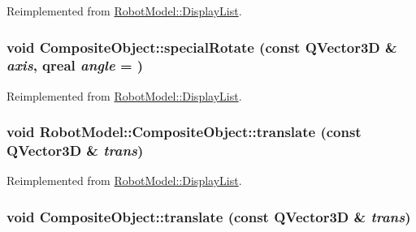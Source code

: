 Reimplemented from \hyperlink{class_robot_model_1_1_display_list_abd15964fcf47dbfdcb06d89517871152}{RobotModel::DisplayList}.\hypertarget{class_robot_model_1_1_composite_object_ad44b9c1759209367754dafd77c984d6f}{
\subsubsection[{specialRotate}]{\setlength{\rightskip}{0pt plus 5cm}void CompositeObject::specialRotate (const QVector3D \& {\em axis}, \/  qreal {\em angle} = {})}}
\label{class_robot_model_1_1_composite_object_ad44b9c1759209367754dafd77c984d6f}


Reimplemented from \hyperlink{class_robot_model_1_1_display_list_abd15964fcf47dbfdcb06d89517871152}{RobotModel::DisplayList}.\hypertarget{class_robot_model_1_1_composite_object_a7704da6de6211738327170423c1a3d83}{
\subsubsection[{translate}]{\setlength{\rightskip}{0pt plus 5cm}void RobotModel::CompositeObject::translate (const QVector3D \& {\em trans})}}
\label{class_robot_model_1_1_composite_object_a7704da6de6211738327170423c1a3d83}


Reimplemented from \hyperlink{class_robot_model_1_1_display_list_a6eb574d1f9929d9e2141dbacdeeb1b6a}{RobotModel::DisplayList}.\hypertarget{class_robot_model_1_1_composite_object_afd942b7fa3b18bcc01c3fba417a6c027}{
\subsubsection[{translate}]{\setlength{\rightskip}{0pt plus 5cm}void CompositeObject::translate (const QVector3D \& {\em trans})}}
\label{class_robot_model_1_1_composite_object_afd942b7fa3b18bcc01c3fba417a6c027}


